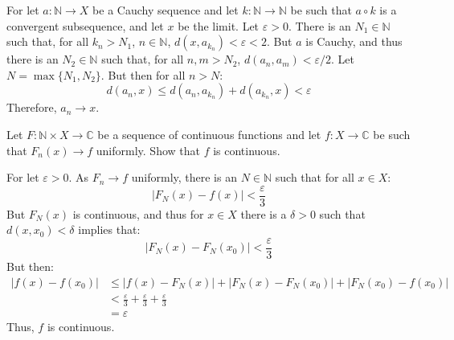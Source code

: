 \documentclass[crop=false,class=article,oneside]{standalone}
\begin{document}
    \begin{solution}
        For let $a:\mathbb{N}\rightarrow{X}$ be a Cauchy sequence and
        let $k:\mathbb{N}\rightarrow\mathbb{N}$ be such that
        $a\circ{k}$ is a convergent subsequence, and let $x$ be the limit.
        Let $\varepsilon>0$. There is an $N_{1}\in\mathbb{N}$ such that,
        for all $k_{n}>N_{1}$, $n\in\mathbb{N}$,
        $d(x,a_{k_{n}})<\varepsilon<2$. But $a$ is Cauchy, and thus there
        is an $N_{2}\in\mathbb{N}$ such that, for all $n,m>N_{2}$,
        $d(a_{n},a_{m})<\varepsilon/2$. Let $N=\max\{N_{1},N_{2}\}$.
        But then for all $n>N$:
        \begin{equation}
            d(a_{n},x)\leq
            d(a_{n},a_{k_{n}})+d(a_{k_{n}},x)<\varepsilon
        \end{equation}
        Therefore, $a_{n}\rightarrow{x}$.
    \end{solution}
    \begin{problem}
        Let $F:\mathbb{N}\times{X}\rightarrow\mathbb{C}$ be a sequence
        of continuous functions and let $f:X\rightarrow\mathbb{C}$ be
        such that $F_{n}(x)\rightarrow{f}$ uniformly. Show that $f$ is
        continuous.
    \end{problem}
    \begin{solution}
        For let $\varepsilon>0$. As $F_{n}\rightarrow{f}$ uniformly,
        there is an $N\in\mathbb{N}$ such that for all $x\in{X}$:
        \begin{equation}
            |F_{N}(x)-f(x)|<\frac{\varepsilon}{3}
        \end{equation}
        But $F_{N}(x)$ is continuous, and thus for $x\in{X}$ there is
        a $\delta>0$ such that $d(x,x_{0})<\delta$ implies that:
        \begin{equation}
            |F_{N}(x)-F_{N}(x_{0})|<\frac{\varepsilon}{3}
        \end{equation}
        But then:
        \begin{subequations}
            \begin{align}
                |f(x)-f(x_{0})|&\leq
                |f(x)-F_{N}(x)|+|F_{N}(x)-F_{N}(x_{0})|+
                |F_{N}(x_{0})-f(x_{0})|\\
                &<\frac{\varepsilon}{3}+\frac{\varepsilon}{3}+
                    \frac{\varepsilon}{3}\\
                &=\varepsilon
            \end{align}
        \end{subequations}
        Thus, $f$ is continuous.
    \end{solution}
\end{document}
